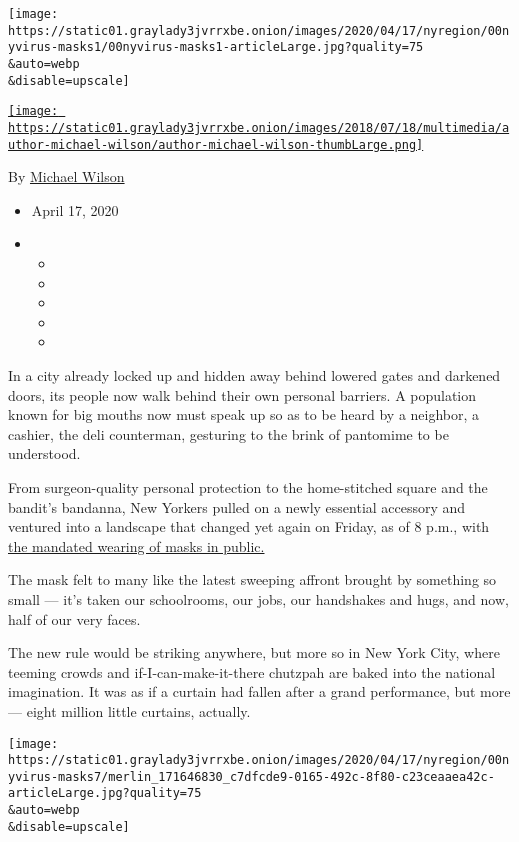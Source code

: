 \texttt{[image: https://static01.graylady3jvrrxbe.onion/images/2020/04/17/nyregion/00nyvirus-masks1/00nyvirus-masks1-articleLarge.jpg?quality=75\\\&auto=webp\\\&disable=upscale]}

\href{https://www.nytimes3xbfgragh.onion/by/michael-wilson}{\texttt{[image: https://static01.graylady3jvrrxbe.onion/images/2018/07/18/multimedia/author-michael-wilson/author-michael-wilson-thumbLarge.png]}}

By \href{https://www.nytimes3xbfgragh.onion/by/michael-wilson}{Michael
Wilson}

\begin{itemize}
\item
  April 17, 2020
\item
  \begin{itemize}
  \item
  \item
  \item
  \item
  \item
  \end{itemize}
\end{itemize}

In a city already locked up and hidden away behind lowered gates and
darkened doors, its people now walk behind their own personal barriers.
A population known for big mouths now must speak up so as to be heard by
a neighbor, a cashier, the deli counterman, gesturing to the brink of
pantomime to be understood.

From surgeon-quality personal protection to the home-stitched square and
the bandit's bandanna, New Yorkers pulled on a newly essential accessory
and ventured into a landscape that changed yet again on Friday, as of 8
p.m., with
\href{https://www.nytimes3xbfgragh.onion/2020/04/15/nyregion/coronavirus-face-masks-andrew-cuomo.html}{the
mandated wearing of masks in public.}

The mask felt to many like the latest sweeping affront brought by
something so small --- it's taken our schoolrooms, our jobs, our
handshakes and hugs, and now, half of our very faces.

The new rule would be striking anywhere, but more so in New York City,
where teeming crowds and if-I-can-make-it-there chutzpah are baked into
the national imagination. It was as if a curtain had fallen after a
grand performance, but more --- eight million little curtains, actually.

\texttt{[image: https://static01.graylady3jvrrxbe.onion/images/2020/04/17/nyregion/00nyvirus-masks7/merlin\_171646830\_c7dfcde9-0165-492c-8f80-c23ceaaea42c-articleLarge.jpg?quality=75\\\&auto=webp\\\&disable=upscale]}

